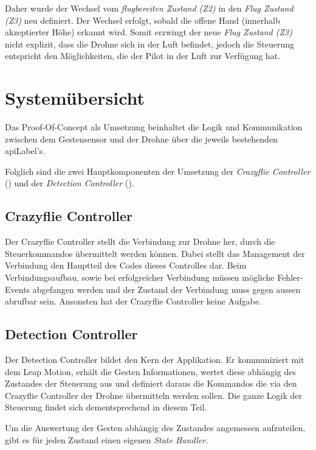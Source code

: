 Daher wurde der Wechsel vom \textit{flugbereiten Zustand (Z2)} in den \textit{Flug Zustand (Z3)} neu definiert.
Der Wechsel erfolgt, sobald die offene Hand (innerhalb akzeptierter Höhe) erkannt wird.
Somit erzwingt der neue \textit{Flug Zustand (Z3)} nicht explizit, dass die Drohne sich in der Luft befindet, jedoch die Steuerung entspricht den Möglichkeiten, die der Pilot in der Luft zur Verfügung hat.


\section{Systemübersicht}
Das Proof-Of-Concept als Umsetzung beinhaltet die Logik und Kommunikation zwischen dem Gestensensor und der Drohne über die jeweils bestehenden \gls{apiLabel}'s.

Folglich sind die zwei Hauptkomponenten der Umsetzung der \textit{Crazyflie Controller} () und der \textit{Detection Controller} ().

\subsection{Crazyflie Controller}
\label{sec:poc:controllerCrazyflie}
Der Crazyflie Controller stellt die Verbindung zur Drohne her, durch die Steuerkommandos übermittelt werden können.
Dabei stellt das Management der Verbindung den Hauptteil des Codes dieses Controlles dar.
Beim Verbindungsaufbau, sowie bei erfolgreicher Verbindung müssen mögliche Fehler-Events abgefangen werden und der Zustand der Verbindung muss gegen aussen abrufbar sein.
Ansonsten hat der Crazyflie Controller keine Aufgabe.

\subsection{Detection Controller}
\label{sec:poc:controllerDetection}
Der Detection Controller bildet den Kern der Applikation. Er kommuniziert mit dem Leap Motion, erhält die Gesten Informationen, wertet diese abhängig des Zustandes der Steuerung aus und definiert daraus die Kommandos die via den Crazyflie Controller der Drohne übermitteln werden sollen.
Die ganze Logik der Steuerung findet sich dementsprechend in diesem Teil.

Um die Auswertung der Gesten abhängig des Zustandes angemessen aufzuteilen, gibt es für jeden Zustand einen eigenen \textit{State Handler}.

